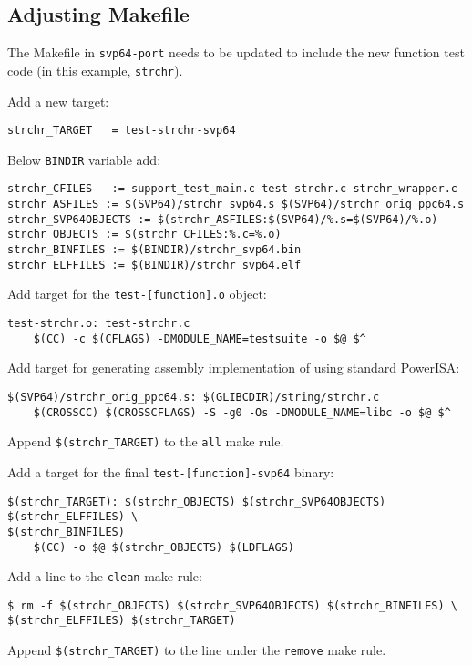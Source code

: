 \subsection{Adjusting Makefile}

The Makefile in \texttt{svp64-port} needs to be updated to include the new
function test code (in this example, \texttt{strchr}).

Add a new target:

\begin{verbatim}
strchr_TARGET	= test-strchr-svp64
\end{verbatim}

Below \texttt{BINDIR} variable add:
\begin{verbatim}
strchr_CFILES	:= support_test_main.c test-strchr.c strchr_wrapper.c
strchr_ASFILES := $(SVP64)/strchr_svp64.s $(SVP64)/strchr_orig_ppc64.s
strchr_SVP64OBJECTS := $(strchr_ASFILES:$(SVP64)/%.s=$(SVP64)/%.o)
strchr_OBJECTS := $(strchr_CFILES:%.c=%.o)
strchr_BINFILES := $(BINDIR)/strchr_svp64.bin
strchr_ELFFILES := $(BINDIR)/strchr_svp64.elf
\end{verbatim}

Add target for the \texttt{test-[function].o} object:
\begin{verbatim}
test-strchr.o: test-strchr.c
	$(CC) -c $(CFLAGS) -DMODULE_NAME=testsuite -o $@ $^
\end{verbatim}

Add target for generating assembly implementation of using standard PowerISA:
\begin{verbatim}
$(SVP64)/strchr_orig_ppc64.s: $(GLIBCDIR)/string/strchr.c
	$(CROSSCC) $(CROSSCFLAGS) -S -g0 -Os -DMODULE_NAME=libc -o $@ $^
\end{verbatim}

Append \texttt{\$(strchr\_TARGET)} to the \texttt{all} make rule.

Add a target for the final \texttt{test-[function]-svp64} binary:
\begin{verbatim}
$(strchr_TARGET): $(strchr_OBJECTS) $(strchr_SVP64OBJECTS) $(strchr_ELFFILES) \
$(strchr_BINFILES)
	$(CC) -o $@ $(strchr_OBJECTS) $(LDFLAGS)
\end{verbatim}

Add a line to the \texttt{clean} make rule:
\begin{verbatim}
$ rm -f $(strchr_OBJECTS) $(strchr_SVP64OBJECTS) $(strchr_BINFILES) \
$(strchr_ELFFILES) $(strchr_TARGET)
\end{verbatim}

Append \texttt{\$(strchr\_TARGET)} to the line under the \texttt{remove} make rule.

